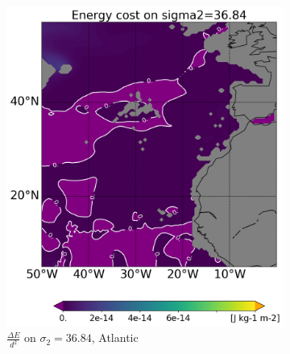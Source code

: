 \begin{figure}[htbp]
    \centering
     \begin{subfigure}[b]{0.4\textwidth}
         
         \includegraphics[width=\textwidth]{plots/energy/atlantic_energy/Map2dcyl_energy_on_sigma2_3684e-2_reg310Eto360E05Nto57N_1990to1998av_WOCE.png}
         \caption{$\frac{\Delta E}{d^2}$ on $\sigma_2 = 36.84$, Atlantic}
         \label{fig:subplot_atlantic_energy_sigma_2}
     \end{subfigure}
     \hfill
     \begin{subfigure}[b]{0.4\textwidth}
         

\end{subfigure}
\end{figure}
